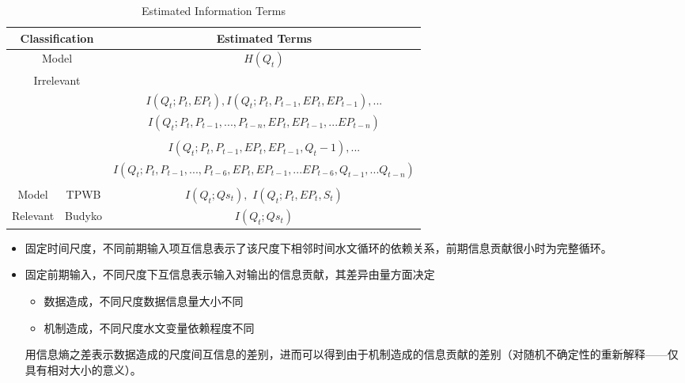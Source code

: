 \documentclass{beamer}
\begin{document}
\begin{CJK}{UTF8}{gkai}
\begin{frame}
\begin{table}[H]\tiny
\caption{Estimated Information Terms} 
\begin{center}
\begin{tabular}{ccc}
\toprule
\multicolumn{2}{c}{Classification} &  Estimated Terms \\
\midrule
\multicolumn{2}{c}{Model} &$H(Q_t)$ \\
\multicolumn{2}{c}{Irrelevant}\\
&&
$I(Q_t;P_t,EP_t),I(Q_t;P_t,P_{t-1},EP_t,EP_{t-1}),...$\\
&&$I(Q_t;P_t,P_{t-1},...,P_{t-n},EP_t,EP_{t-1},...EP_{t-n})$\\
&&\\
&&$I(Q_t;P_t,P_{t-1},EP_t,EP_{t-1},Q_t-1),...$\\
&&$I(Q_t;P_t,P_{t-1},...,P_{t-6},EP_t,EP_{t-1},...EP_{t-6},Q_{t-1},...Q_{t-n})$\\
&&\\
Model & TPWB&$I(Q_t;Qs_t),$ $I(Q_t;P_t,EP_t,S_t)$  \\
Relevant      & Budyko& $I(Q_t;Qs_t)$\\

 \bottomrule
\end{tabular}
\end{center}
\end{table}
\end{frame}

\begin{frame}
\begin{itemize}
\item 固定时间尺度，不同前期输入项互信息表示了该尺度下相邻时间水文循环的依赖关系，前期信息贡献很小时为完整循环。
\item 固定前期输入，不同尺度下互信息表示输入对输出的信息贡献，其差异由量方面决定
\begin{itemize}
\item 数据造成，不同尺度数据信息量大小不同
\item 机制造成，不同尺度水文变量依赖程度不同
\end{itemize}
用信息熵之差表示数据造成的尺度间互信息的差别，进而可以得到由于机制造成的信息贡献的差别（对随机不确定性的重新解释——仅具有相对大小的意义）。
\end{itemize} 
\end{frame}




\end{CJK}
\end{document}
